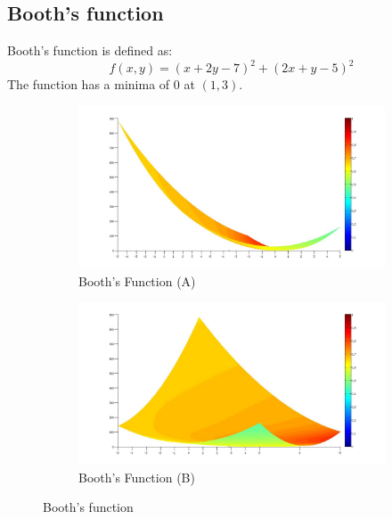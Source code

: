 \documentclass[a4paper]{article}
\begin{document}
\clearpage

\subsection{Booth's function}

Booth's function is defined as:
\begin{equation}
f(x,y)=(x+2y-7)^2+(2x+y-5)^2
\end{equation}
The function has a minima of 0 at $(1,3)$.

\begin{figure}[hb!]
\begin{subfigure}[b]{0.5\textwidth}
\centering
\includegraphics[width=1.2\textwidth]{BoothA.jpg}
\caption{Booth's Function (A)}
\label{B2A}
\end{subfigure}
\quad
\begin{subfigure}[b]{0.5\textwidth}
\includegraphics[width=1.2\textwidth]{BoothB.jpg}
\caption{Booth's Function (B)}
\label{B2B}
\end{subfigure}
\caption{Booth's function}
\label{B2}
\end{figure}
\end{document}
